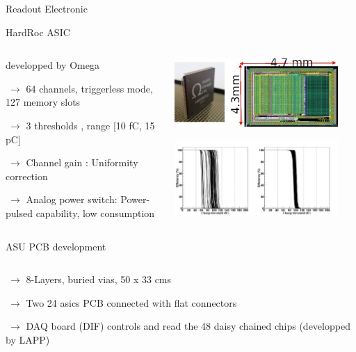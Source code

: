 \documentclass[10pt]{beamer}
\begin{document}
\begin{frame}[shrink=3]{Readout Electronic}
  \begin{block}{HardRoc ASIC}
    \begin{columns}
      \begin{column}{0.5\textwidth}
        {\small 
          developped by Omega
          \par $ ~ \rightarrow$ 64 channels, triggerless mode, 127 memory slots
          \par $ ~\rightarrow$  3 thresholds , range [10 fC,  15 pC]
          \par $ ~\rightarrow$  Channel gain : Uniformity correction
          \par $ ~\rightarrow$  Analog power switch: Power-pulsed capability, low consumption

        }
      \end{column}

      \begin{column}{0.5\textwidth}
        \centerline{\includegraphics[width=0.9\textwidth]{jpg/HR2Chip}}
        \centerline{\includegraphics[width=0.9\textwidth]{jpg/HR2GainAdjustement}}
      \end{column}

    \end{columns}
  \end{block}
  \pause
  \begin{block}{ASU PCB development}
    \begin{columns}
      \begin{column}{0.5\textwidth}
        {\small 
          \par $ ~ \rightarrow$ 8-Layers, buried vias, 50 x 33 cms
          \par $ ~\rightarrow$  Two 24 asics PCB connected with flat connectors
          \par $ ~\rightarrow$  DAQ board (DIF) controls and read the 48 daisy chained chips (developped by LAPP)
        }
      \end{column}


\end{columns}
\end{block}
\end{frame}
\end{document}
